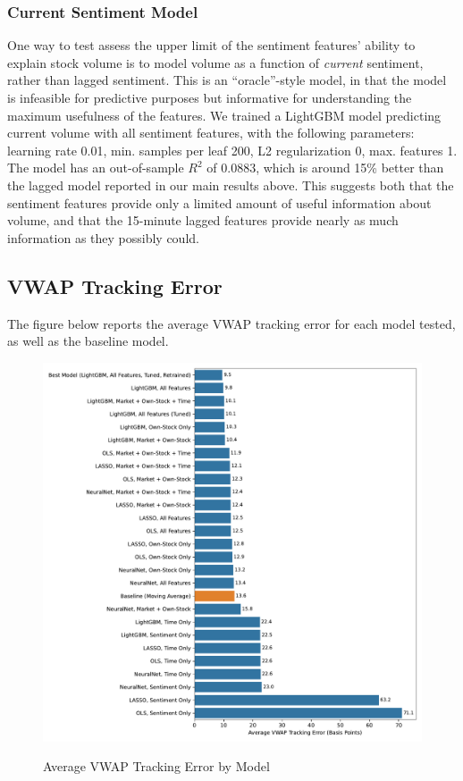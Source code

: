 \documentclass[12pt]{article}
\begin{document}
\subsubsection{Current Sentiment Model}
\label{section:appendix_sentiment}
One way to test assess the upper limit of the sentiment features' ability to explain stock volume is to model volume as a function of \textit{current} sentiment, rather than lagged sentiment. This is an ``oracle''-style model, in that the model is infeasible for predictive purposes but informative for understanding the maximum usefulness of the features. We trained a LightGBM model predicting current volume with all sentiment features, with the following parameters: learning rate 0.01, min. samples per leaf 200, L2 regularization 0, max. features 1. The model has an out-of-sample $R^2$ of 0.0883, which is around 15\% better than the lagged model reported in our main results above. This suggests both that the sentiment features provide only a limited amount of useful information about volume, and that the 15-minute lagged features provide nearly as much information as they possibly could.

\subsection{VWAP Tracking Error}
The figure below reports the average VWAP tracking error for each model tested, as well as the baseline model.
\begin{figure}[H]
    \centering
    \caption{Average VWAP Tracking Error by Model}
    \includegraphics[width=\linewidth]{../Output/vwap_compare_all_models.pdf}
    \label{fig:vwap_tracking_error_all}
\end{figure}
\end{document}
